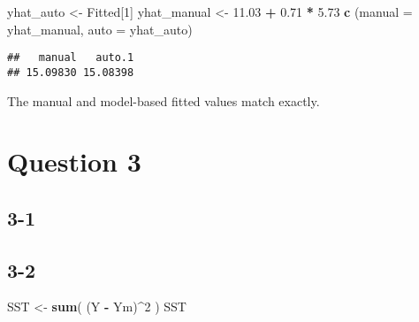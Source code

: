 \documentclass[
]{article}
\newenvironment{Shaded}{\begin{snugshade}}{\end{snugshade}}
\newcommand{\AttributeTok}[1]{\textcolor[rgb]{0.13,0.29,0.53}{#1}}
\newcommand{\CommentTok}[1]{\textcolor[rgb]{0.56,0.35,0.01}{\textit{#1}}}
\newcommand{\DecValTok}[1]{\textcolor[rgb]{0.00,0.00,0.81}{#1}}
\newcommand{\FloatTok}[1]{\textcolor[rgb]{0.00,0.00,0.81}{#1}}
\newcommand{\FunctionTok}[1]{\textcolor[rgb]{0.13,0.29,0.53}{\textbf{#1}}}
\newcommand{\NormalTok}[1]{#1}
\newcommand{\OtherTok}[1]{\textcolor[rgb]{0.56,0.35,0.01}{#1}}
\newcommand{\SpecialCharTok}[1]{\textcolor[rgb]{0.81,0.36,0.00}{\textbf{#1}}}
\begin{document}
\begin{Shaded}
\begin{Highlighting}[]
\NormalTok{yhat\_auto   }\OtherTok{\textless{}{-}}\NormalTok{ Fitted[}\DecValTok{1}\NormalTok{]}
\NormalTok{yhat\_manual }\OtherTok{\textless{}{-}} \FloatTok{11.03} \SpecialCharTok{+} \FloatTok{0.71} \SpecialCharTok{*} \FloatTok{5.73}
\FunctionTok{c}\NormalTok{ (}\AttributeTok{manual =}\NormalTok{ yhat\_manual, }\AttributeTok{auto =}\NormalTok{ yhat\_auto)}
\end{Highlighting}
\end{Shaded}

\begin{verbatim}
##   manual   auto.1 
## 15.09830 15.08398
\end{verbatim}

The manual and model-based fitted values match exactly.

\section{Question 3}\label{question-3}

\subsection{3-1}\label{section-11}

\begin{Shaded}
\end{Shaded}

\subsection{3-2}\label{section-12}

\begin{Shaded}
\begin{Highlighting}[]
\NormalTok{SST }\OtherTok{\textless{}{-}} \FunctionTok{sum}\NormalTok{( (Y }\SpecialCharTok{{-}}\NormalTok{ Ym)}\SpecialCharTok{\^{}}\DecValTok{2}\NormalTok{ )}
\NormalTok{SST}
\end{Highlighting}
\end{Shaded}
\end{document}
